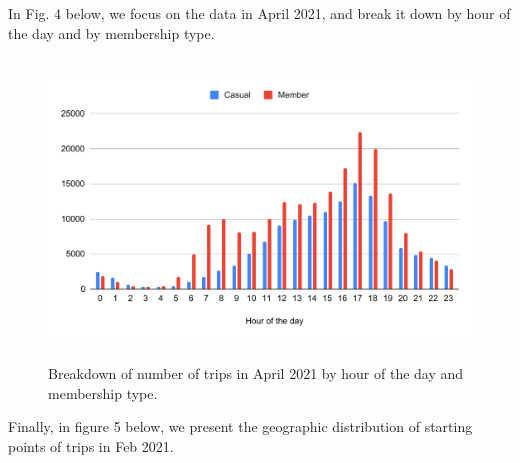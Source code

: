 \documentclass[11pt,twoside]{article}
\theoremstyle{plain}
\theoremstyle{definition}
\theoremstyle{remark}
\begin{document}
In Fig. 4 below, we focus on the data in April 2021, and break it down by hour of the day and by membership type.
\begin{center}
\begin{figure}
\includegraphics[width=12cm, height=8cm]{BreakdownByHour.pdf}
\caption{Breakdown of number of trips in April 2021 by hour of the day and membership type.}
\end{figure}
\end{center}
Finally, in figure 5 below, we present the geographic distribution of starting points of trips in Feb 2021.
\end{document}
